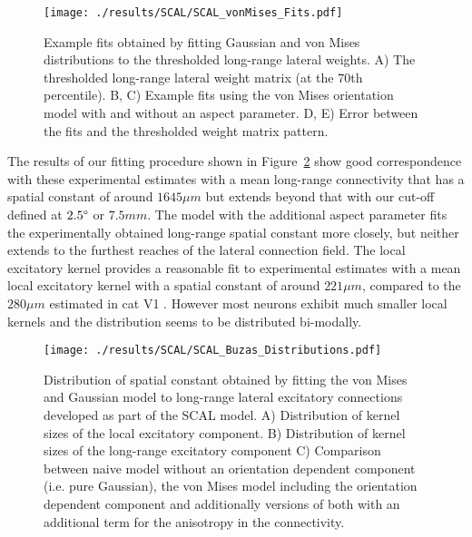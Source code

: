 \begin{figure}
	\centering
        \texttt{[image: ./results/SCAL/SCAL\_vonMises\_Fits.pdf]}
	\caption[Combined Gaussian+von Mises model fits to lateral
      connectivity of the SCAL model.]{Example fits obtained by
      fitting Gaussian and von Mises distributions to the thresholded
      long-range lateral weights. A) The thresholded long-range
      lateral weight matrix (at the 70th percentile). B, C) Example
      fits using the von Mises orientation model with and without an
      aspect parameter. D, E) Error between the fits and the
      thresholded weight matrix pattern.}
	\label{LatFits}
\end{figure}

The results of our fitting procedure shown in Figure~\ref{LatDist}
show good correspondence with these experimental estimates with a mean
long-range connectivity that has a spatial constant of around $1645
\mu m$ but extends beyond that with our cut-off defined at
$2.5\degree$ or $7.5 mm$. The model with the additional aspect
parameter fits the experimentally obtained long-range spatial constant
more closely, but neither extends to the furthest reaches of the
lateral connection field. The local excitatory kernel provides a
reasonable fit to experimental estimates with a mean local excitatory
kernel with a spatial constant of around $221 \mu m$, compared to the
$280 \mu m$ estimated in cat V1 \citep{Buzas2006}. However most
neurons exhibit much smaller local kernels and the distribution seems
to be distributed bi-modally.

\begin{figure}
	\centering
        \texttt{[image: ./results/SCAL/SCAL\_Buzas\_Distributions.pdf]}
	\caption[Distribution of spatial constants obtained by fitting
      Gaussian and von Mises model.]{Distribution of spatial constant
      obtained by fitting the \cite{Buzas2006} von Mises and Gaussian
      model to long-range lateral excitatory connections developed as
      part of the SCAL model. A) Distribution of kernel sizes of the
      local excitatory component. B) Distribution of kernel sizes of
      the long-range excitatory component C) Comparison between naive
      model without an orientation dependent component (i.e. pure
      Gaussian), the von Mises model including the orientation
      dependent component and additionally versions of both with an
      additional term for the anisotropy in the connectivity.}
	\label{LatDist}
\end{figure}

